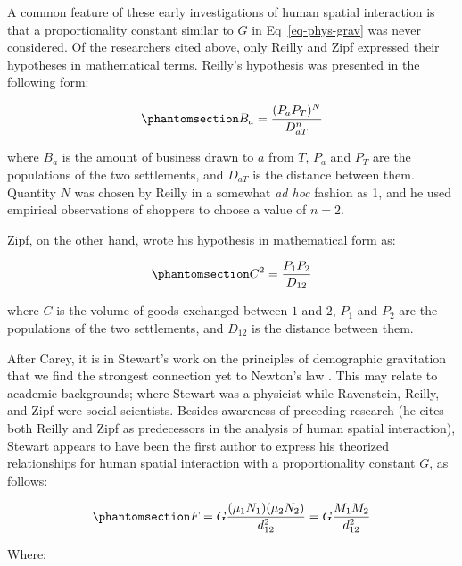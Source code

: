 \documentclass[
  10pt,
  letterpaper,
]{article}
\begin{document}
A common feature of these early investigations of human spatial
interaction is that a proportionality constant similar to \(G\) in
Eq~\ref{eq-phys-grav} was never considered. Of the researchers cited
above, only Reilly and Zipf expressed their hypotheses in mathematical
terms. Reilly's hypothesis was presented in the following form:

\begin{equation}\phantomsection\label{eq-reilly}{
B_a = \frac{(P_a P_T)^N}{D_{aT}^n}
}\end{equation}

\noindent where \(B_a\) is the amount of business drawn to \(a\) from
\(T\), \(P_a\) and \(P_T\) are the populations of the two settlements,
and \(D_{aT}\) is the distance between them. Quantity \(N\) was chosen
by Reilly in a somewhat \emph{ad hoc} fashion as 1, and he used
empirical observations of shoppers to choose a value of \(n = 2\).

Zipf, on the other hand, wrote his hypothesis in mathematical form as:

\begin{equation}\phantomsection\label{eq-zipf}{
C^2 = \frac{P_1 P_2}{D_{12}}
}\end{equation}

\noindent where \(C\) is the volume of goods exchanged between \(1\) and
\(2\), \(P_1\) and \(P_2\) are the populations of the two settlements,
and \(D_{12}\) is the distance between them.

After Carey, it is in Stewart's work on the principles of demographic
gravitation that we find the strongest connection yet to Newton's law
\citep{stewartDemographicGravitationEvidence1948}. This may relate to
academic backgrounds; where Stewart was a physicist while Ravenstein,
Reilly, and Zipf were social scientists. Besides awareness of preceding
research (he cites both Reilly and Zipf as predecessors in the analysis
of human spatial interaction), Stewart appears to have been the first
author to express his theorized relationships for human spatial
interaction with a proportionality constant \(G\), as follows:

\begin{equation}\phantomsection\label{eq-stewart-force}{
F = G\frac{(\mu_1N_1)(\mu_2N_2)}{d_{12}^2} = G\frac{M_1 M_2}{d_{12}^2} 
}\end{equation}

\noindent Where:
\end{document}
